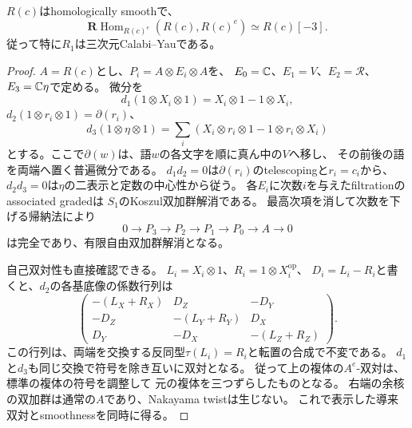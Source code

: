 \begin{proposition}
\label{prop:quotient-constant-cy}
$R(c)$はhomologically smoothで、
\[
 \mathbf R\operatorname{Hom}_{R(c)^e}(R(c),R(c)^e)
 \simeq R(c)[-3].
\]
従って特に$R_1$は三次元Calabi--Yauである。
\end{proposition}
\begin{proof}
$A=R(c)$とし、$P_i=A\otimes E_i\otimes A$を、
$E_0=\mathbb C$、$E_1=V$、$E_2=\mathcal R$、$E_3=\mathbb C\eta$で定める。
微分を
\[
 d_1(1\otimes X_i\otimes1)=X_i\otimes1-1\otimes X_i,
\]
$d_2(1\otimes r_i\otimes1)=\partial(r_i)$、
\[
 d_3(1\otimes\eta\otimes1)
 =\sum_i(X_i\otimes r_i\otimes1-1\otimes r_i\otimes X_i)
\]
とする。ここで$\partial(w)$は、語$w$の各文字を順に真ん中の$V$へ移し、
その前後の語を両端へ置く普遍微分である。
$d_1d_2=0$は$\partial(r_i)$のtelescopingと$r_i=c_i$から、
$d_2d_3=0$は$\eta$の二表示と定数の中心性から従う。
各$E_i$に次数$i$を与えたfiltrationのassociated gradedは
$S_1$のKoszul双加群解消である。
最高次項を消して次数を下げる帰納法により
\[
 0\to P_3\to P_2\to P_1\to P_0\to A\to0
\]
は完全であり、有限自由双加群解消となる。

自己双対性も直接確認できる。
$L_i=X_i\otimes1$、$R_i=1\otimes X_i^{\mathrm{op}}$、
$D_i=L_i-R_i$と書くと、$d_2$の各基底像の係数行列は
\[
 \begin{pmatrix}
 -(L_X+R_X)&D_Z&-D_Y\\
 -D_Z&-(L_Y+R_Y)&D_X\\
 D_Y&-D_X&-(L_Z+R_Z)
 \end{pmatrix}.
\]
この行列は、両端を交換する反同型$\tau(L_i)=R_i$と転置の合成で不変である。
$d_1$と$d_3$も同じ交換で符号を除き互いに双対となる。
従って上の複体の$A^e$-双対は、標準の複体の符号を調整して
元の複体を三つずらしたものとなる。
右端の余核の双加群は通常の$A$であり、Nakayama twistは生じない。
これで表示した導来双対とsmoothnessを同時に得る。
\end{proof}

